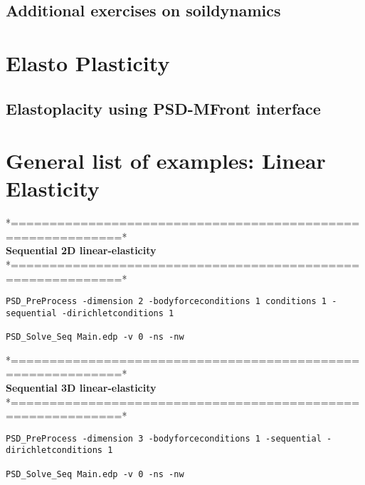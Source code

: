 \subsection{Additional exercises on soildynamics}
{
	\renewcommand{\subsection}{\subsubsection}
	
}

\section{Elasto Plasticity}

\subsection{Elastoplacity using PSD-MFront interface}
{
	\renewcommand{\subsection}{\subsubsection}
	
}

\pagebreak

\section{General list of examples: Linear Elasticity}
 *============================================================*\\
  \textbf{Sequential  2D linear-elasticity}\\                   
 *============================================================*\\
\begin{lstlisting}[style=BashInputStyle] 
PSD_PreProcess -dimension 2 -bodyforceconditions 1 conditions 1 -sequential -dirichletconditions 1 
	
PSD_Solve_Seq Main.edp -v 0 -ns -nw 
\end{lstlisting}


*============================================================*\\
 \textbf{Sequential  3D linear-elasticity}                   \\
*============================================================*\\
\begin{lstlisting}[style=BashInputStyle] 
PSD_PreProcess -dimension 3 -bodyforceconditions 1 -sequential -dirichletconditions 1

PSD_Solve_Seq Main.edp -v 0 -ns -nw
\end{lstlisting}


